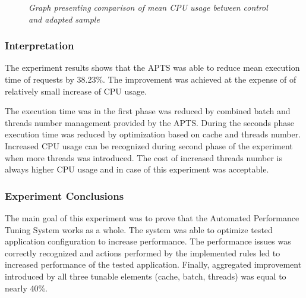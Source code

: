 \documentclass[10pt,a4paper]{article}
\begin{document}
\begin{figure}[!htb]
\centering
{}
\caption{\textit{Graph presenting comparison of mean CPU usage between control and adapted sample}} \label{figure:combined:results:cpuusage}
\end{figure}


\subsubsection{Interpretation} 

The experiment results shows that the APTS was able to reduce mean execution time of requests by 38.23\%. The improvement was achieved at the expense of of relatively small increase of CPU usage. 

The execution time was in the first phase was reduced by combined batch and threads number management provided by the APTS. During the seconds phase execution time was reduced by optimization based on cache and threads number. Increased CPU usage can be recognized during second phase of the experiment when more threads was introduced. The cost of increased threads number is always higher CPU usage and in case of this experiment was acceptable.  

\subsubsection{Experiment Conclusions} 

The main goal of this experiment was to prove that the Automated Performance Tuning System works as a whole. The system was able to optimize tested application configuration to increase performance. The performance issues was correctly recognized and actions performed by the implemented rules led to increased performance of the tested application. Finally, aggregated improvement introduced by all three tunable elements (cache, batch, threads) was equal to nearly 40\%.
\end{document}

